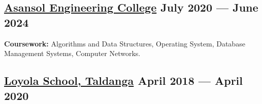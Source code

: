 





\subsection{{\href{https://www.aecwb.edu.in}{Asansol Engineering College} \hfill July 2020 --- June 2024}}

\vspace{0.25em}
\subtext{}\textbf{Coursework:} Algorithms and Data Structures, Operating System, Database Management Systems, Computer Networks.
\vspace{0.2em}
\begin{null}
\end{null}

\subsection{{\href{https://www.loyolataldanga.com/}{Loyola School, Taldanga} \hfill April 2018 --- April 2020}}
\begin{null}

\end{null}


